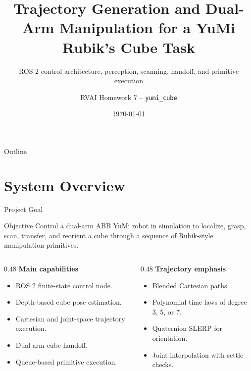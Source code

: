 \documentclass[10pt,aspectratio=169]{beamer}
\title[YuMi Cube Trajectories]{Trajectory Generation and Dual-Arm Manipulation for a YuMi Rubik's Cube Task}
\subtitle{ROS 2 control architecture, perception, scanning, handoff, and primitive execution}
\author{RVAI Homework 7 -- \texttt{yumi\_cube}}
\institute{Academic scientific presentation}
\date{\today}
\begin{document}
\begin{frame}
  \titlepage
\end{frame}

\begin{frame}{Outline}
  \tableofcontents
\end{frame}

\section{System Overview}

\begin{frame}{Project Goal}
  \begin{block}{Objective}
    Control a dual-arm ABB YuMi robot in simulation to localize, grasp, scan, transfer, and reorient a cube through a sequence of Rubik-style manipulation primitives.
  \end{block}

  \vspace{0.2cm}
  \begin{columns}[T]
    \begin{column}{0.48\textwidth}
      \textbf{Main capabilities}
      \begin{itemize}
        \item ROS 2 finite-state control node.
        \item Depth-based cube pose estimation.
        \item Cartesian and joint-space trajectory execution.
        \item Dual-arm cube handoff.
        \item Queue-based primitive execution.
      \end{itemize}
    \end{column}
    \begin{column}{0.48\textwidth}
      \textbf{Trajectory emphasis}
      \begin{itemize}
        \item Blended Cartesian paths.
        \item Polynomial time laws of degree 3, 5, or 7.
        \item Quaternion SLERP for orientation.
        \item Joint interpolation with settle checks.
      \end{itemize}
    \end{column}
  \end{columns}
\end{frame}
\end{document}
